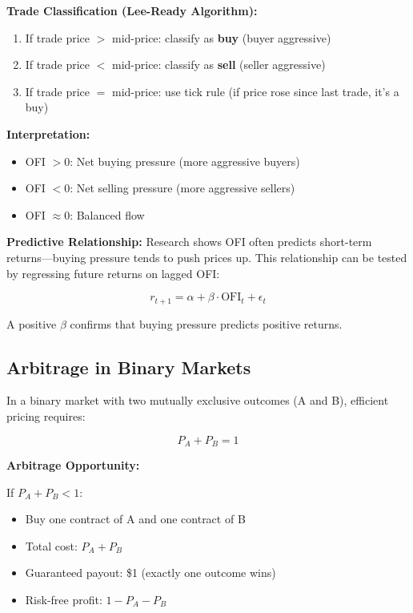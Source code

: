 \textbf{Trade Classification (Lee-Ready Algorithm):}
\begin{enumerate}
    \item If trade price $>$ mid-price: classify as \textbf{buy} (buyer aggressive)
    \item If trade price $<$ mid-price: classify as \textbf{sell} (seller aggressive)
    \item If trade price $=$ mid-price: use tick rule (if price rose since last trade, it's a buy)
\end{enumerate}

\textbf{Interpretation:}
\begin{itemize}
    \item OFI $> 0$: Net buying pressure (more aggressive buyers)
    \item OFI $< 0$: Net selling pressure (more aggressive sellers)
    \item OFI $\approx 0$: Balanced flow
\end{itemize}

\textbf{Predictive Relationship:} Research shows OFI often predicts short-term returns---buying pressure tends to push prices up. This relationship can be tested by regressing future returns on lagged OFI:

\begin{equation}
r_{t+1} = \alpha + \beta \cdot \text{OFI}_t + \epsilon_t
\end{equation}

A positive $\beta$ confirms that buying pressure predicts positive returns.

\subsection{Arbitrage in Binary Markets}
\label{method:arbitrage-appendix}

In a binary market with two mutually exclusive outcomes (A and B), efficient pricing requires:

\begin{equation}
P_A + P_B = 1
\end{equation}

\textbf{Arbitrage Opportunity:}

If $P_A + P_B < 1$:
\begin{itemize}
    \item Buy one contract of A and one contract of B
    \item Total cost: $P_A + P_B$
    \item Guaranteed payout: \$1 (exactly one outcome wins)
    \item Risk-free profit: $1 - P_A - P_B$
\end{itemize}

